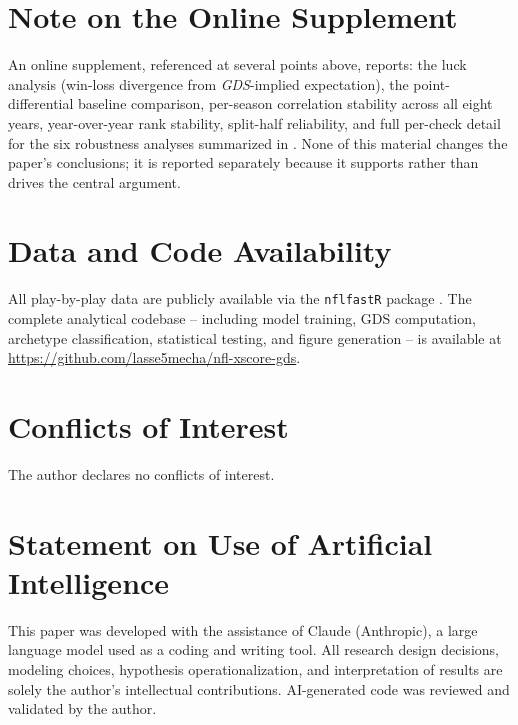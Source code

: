 \documentclass[12pt,a4paper]{article}
\newcommand{\gds}{\textit{GDS}}
\begin{document}
\section*{Note on the Online Supplement}
\label{sec:supplement-pointer}

An online supplement, referenced at several points above, reports: the luck analysis (win-loss divergence from \gds{}-implied expectation), the point-differential baseline comparison, per-season correlation stability across all eight years, year-over-year rank stability, split-half reliability, and full per-check detail for the six robustness analyses summarized in . None of this material changes the paper's conclusions; it is reported separately because it supports rather than drives the central argument.

\section*{Data and Code Availability}

All play-by-play data are publicly available via the \texttt{nflfastR} package \citep{carl2021nflfastr}. The complete analytical codebase -- including model training, GDS computation, archetype classification, statistical testing, and figure generation -- is available at \url{https://github.com/lasse5mecha/nfl-xscore-gds}.

\section*{Conflicts of Interest}

The author declares no conflicts of interest.

\section*{Statement on Use of Artificial Intelligence}

This paper was developed with the assistance of Claude (Anthropic), a large language model used as a coding and writing tool. All research design decisions, modeling choices, hypothesis operationalization, and interpretation of results are solely the author's intellectual contributions. AI-generated code was reviewed and validated by the author.

\printbibliography
\end{document}
